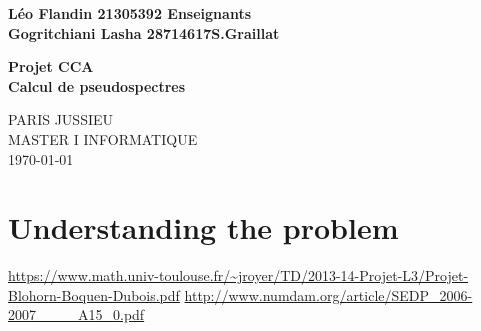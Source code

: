 \documentclass[11pt]{article}
\begin{document}
\noindent
\textbf{ \large{Léo Flandin 21305392    \hfill Enseignants }}\\
\textbf{\large{Gogritchiani Lasha 28714617\hfill S.Graillat}} 
    \vspace*{7cm}
    
    \begin{center}
        \textbf{\Large{Projet CCA} }\\
        \vspace*{1 cm}
    \Huge{\textbf{ Calcul de pseudospectres}}\\
    \end{center}
    \vspace{4cm}
    
    \vfill

    \begin{center}
    \large{PARIS JUSSIEU}\\[0.25cm]
    \large {MASTER I INFORMATIQUE }\\[0.25cm]
    \large{\today}
  \end{center}


  \newpage
  \tableofcontents
  \listoffigures

  \clearpage

  \section{Understanding the problem}
  \url{https://www.math.univ-toulouse.fr/~jroyer/TD/2013-14-Projet-L3/Projet-Blohorn-Boquen-Dubois.pdf}
  \url{http://www.numdam.org/article/SEDP_2006-2007____A15_0.pdf}
\end{document}
